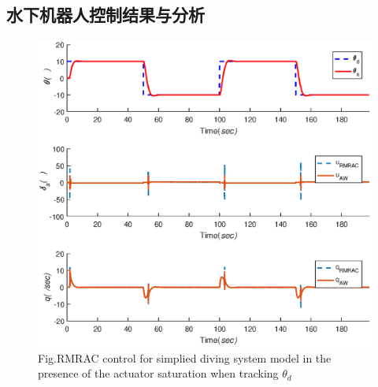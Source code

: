 \subsection{水下机器人控制结果与分析 }

\begin{figure}[!htp]%
\centering
\includegraphics[width=0.85\linewidth]{figure/chap6/Fig1_pulse_theta1.eps}
\label{fig:chap6:F7}
 {Fig.}{RMRAC control for simplied diving system model in the presence of the actuator saturation when tracking $\theta_{d}$}
\end{figure}

